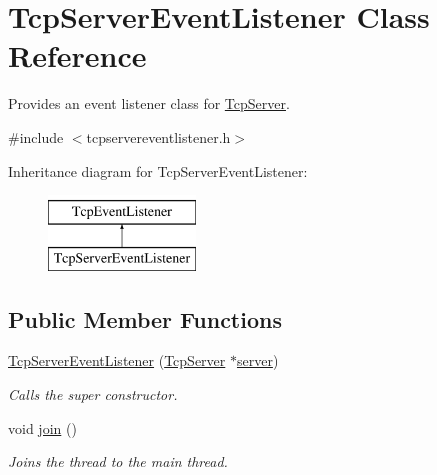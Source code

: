 \hypertarget{class_tcp_server_event_listener}{}\section{Tcp\+Server\+Event\+Listener Class Reference}
\label{class_tcp_server_event_listener}


Provides an event listener class for \mbox{\hyperlink{class_tcp_server}{Tcp\+Server}}.  




{\ttfamily \#include $<$tcpservereventlistener.\+h$>$}

Inheritance diagram for Tcp\+Server\+Event\+Listener\+:\begin{figure}[H]
\begin{center}
\leavevmode
\includegraphics[height=2.000000cm]{class_tcp_server_event_listener}
\end{center}
\end{figure}
\subsection*{Public Member Functions}
\begin{DoxyCompactItemize}
\item 
\mbox{\hyperlink{class_tcp_server_event_listener_a07c2697a13038b4b12ded097e4d6aa2b}{Tcp\+Server\+Event\+Listener}} (\mbox{\hyperlink{class_tcp_server}{Tcp\+Server}} $\ast$\mbox{\hyperlink{class_tcp_event_listener_aa0a66ee360e15e349eda1c10041c3219}{server}})
\begin{DoxyCompactList}\small\item\em Calls the super constructor. \end{DoxyCompactList}\item 
\mbox{\label{class_tcp_server_event_listener_a4e2b349aa6fe166976af80ec1cec2d2d}} 
void \mbox{\hyperlink{class_tcp_server_event_listener_a4e2b349aa6fe166976af80ec1cec2d2d}{join}} ()
\begin{DoxyCompactList}\small\item\em Joins the thread to the main thread. \end{DoxyCompactList}\end{DoxyCompactItemize}
